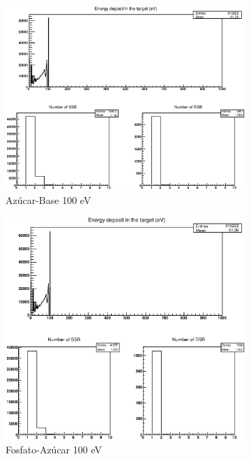 \begin{figure}
\centering
\begin{subfigure}{.5\textwidth}
  \centering
  \includegraphics[width=.9\linewidth]{./Figures/base1.eps}
  \caption{Azúcar-Base 100 eV}
  \label{fig:subei1ll}
\end{subfigure}%
\begin{subfigure}{.5\textwidth}
  \centering
  \includegraphics[width=.78\linewidth]{./Figures/1zbbe100ev.eps}
  \caption{Fosfato-Azúcar 100 eV}
  \label{fig:subei2ll}
\end{subfigure}
\begin{subfigure}{.5\textwidth}
  \centering

\end{subfigure}
\end{figure}
